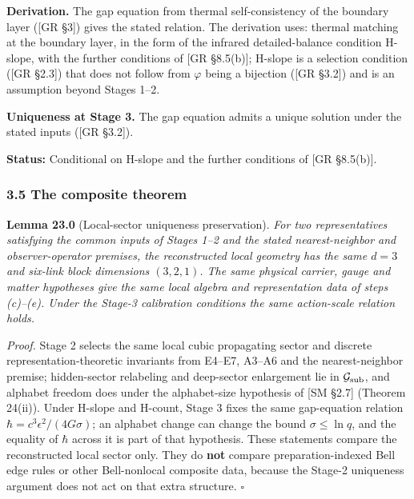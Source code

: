 \documentclass[
]{article}
\begin{document}
\textbf{Derivation.} The gap equation from thermal self-consistency of
the boundary layer ({[}GR §3{]}) gives the stated relation. The
derivation uses: thermal matching at the boundary layer, in the form of
the infrared detailed-balance condition H-slope, with the further
conditions of {[}GR §8.5(b){]}; H-slope is a selection condition ({[}GR
§2.3{]}) that does not follow from \(\varphi\) being a bijection ({[}GR
§3.2{]}) and is an assumption beyond Stages 1--2.

\textbf{Uniqueness at Stage 3.} The gap equation admits a unique
solution under the stated inputs ({[}GR §3.2{]}).

\textbf{Status:} Conditional on H-slope and the further conditions of
{[}GR §8.5(b){]}.

\hypertarget{the-composite-theorem}{%
\subsubsection{3.5 The composite theorem}\label{the-composite-theorem}}

\textbf{Lemma 23.0} (Local-sector uniqueness preservation). \emph{For
two representatives satisfying the common inputs of Stages 1--2 and the
stated nearest-neighbor and observer-operator premises, the
reconstructed local geometry has the same \(d=3\) and six-link block
dimensions \((3,2,1)\). The same physical carrier, gauge and matter
hypotheses give the same local algebra and representation data of steps
(c)--(e). Under the Stage-3 calibration conditions the same action-scale
relation holds.}

\emph{Proof.} Stage 2 selects the same local cubic propagating sector
and discrete representation-theoretic invariants from E4--E7, A3--A6 and
the nearest-neighbor premise; hidden-sector relabeling and deep-sector
enlargement lie in \(\mathcal{G}_{\rm sub}\), and alphabet freedom does
under the alphabet-size hypothesis of {[}SM §2.7{]} (Theorem 24(ii)).
Under H-slope and H-count, Stage 3 fixes the same gap-equation relation
\(\hbar=c^3\epsilon^2/(4G\sigma)\); an alphabet change can change the
bound \(\sigma \leq \ln q\), and the equality of \(\hbar\) across it is
part of that hypothesis. These statements compare the reconstructed
local sector only. They do \textbf{not} compare preparation-indexed Bell
edge rules or other Bell-nonlocal composite data, because the Stage-2
uniqueness argument does not act on that extra structure. \(\square\)
\end{document}
